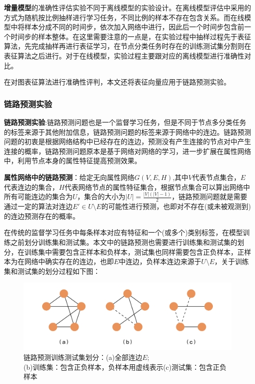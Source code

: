 \textbf{增量模型}的准确性评估实验不同于离线模型的实验设计。在离线模型评估中采用的方式为随机按比例抽样进行学习任务，不同比例的样本不存在包含关系。而在线模型中将样本分成不同的时间步，依次加入网络中进行，因此后一个时间步包含前一个时间步的样本整体。在这里需要注意的一点是，在实验过程中抽样过程先于表征算法，先完成抽样再进行表征学习，在节点分类任务时存在的训练测试集分割则在表征算法之后进行。对于在线模型，实验过程主要跟对应的离线模型进行准确性对比。

在对图表征算法进行准确性评判，本文还将表征向量应用于链路预测实验。
\subsubsection{链路预测实验}
\textbf{链路预测实验}:链路预测问题也是一个监督学习任务，但是不同于节点多分类任务的标签来源于其他附加信息，链路预测问题的标签来源于网络中的连边。链路预测问题的初衷是根据网络结构中已经存在的连边，预测没有产生连接的节点对中产生连接的概率，链路预测问题原本是基于网络对网络的学习，进一步扩展在属性网络中，利用节点本身的属性特征提高预测效果。

\textbf{属性网络中的链路预测}：给定无向属性网络$G(V,E,H)$,其中$V$代表节点集合，$E$代表连边的集合，$H$代表网络节点的属性特征集合，根据节点集合可以算出网络中所有可能连边的集合为$U$，集合的大小为$|U| = \frac{|V|(|V|-1)}{2}$，链路预测问题就是需要通过一定的算法对连边$E\prime\in U\setminus E$的可能性进行预测，也即对不存在(或未被观测到)的连边预测存在的概率。

在传统的监督学习任务中每条样本对应有特征和一个(或多个)类别标签，在模型训练之前划分训练集和测试集。本文中的链路预测也需要进行训练集和测试集的划分，在训练集中需要包含正样本和负样本，测试集也同样需要包含正负样本，正样本为在网络中确实存在的连边，也即$E$中连边，负样本连边来源于$U\setminus E$，关于训练集和测试集的划分过程如下图：
\begin{figure}
	\centering
	\includegraphics[width=5in]{figures/link_prediction_split}
	\caption{链路预测训练测试集划分：(a)全部连边$E$;\\(b)训练集：包含正负样本，负样本用虚线表示(c)测试集：包含正负样本}
\end{figure}

